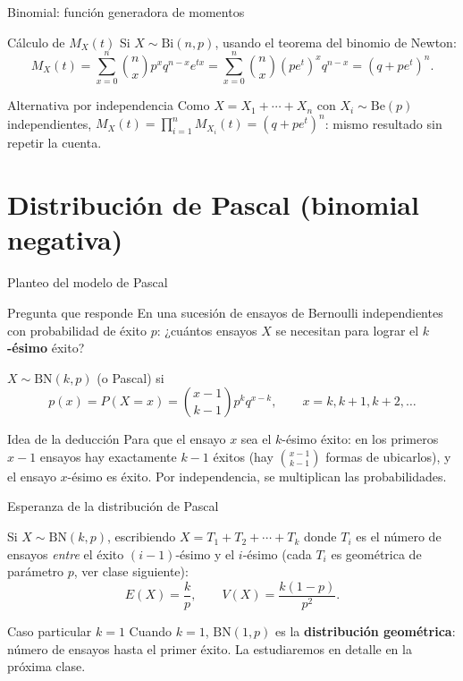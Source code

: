 \documentclass[aspectratio=169,11pt]{beamer}
\begin{document}
\begin{frame}{Binomial: función generadora de momentos}
\begin{block}{Cálculo de $M_X(t)$}
Si $X\sim\text{Bi}(n,p)$, usando el teorema del binomio de Newton:
$$M_X(t) = \sum_{x=0}^n \binom{n}{x}p^xq^{n-x}e^{tx} = \sum_{x=0}^n\binom{n}{x}(pe^t)^xq^{n-x} = (q+pe^t)^n.$$
\end{block}

\begin{alertblock}{Alternativa por independencia}
Como $X=X_1+\cdots+X_n$ con $X_i\sim\text{Be}(p)$ independientes, $M_X(t)=\prod_{i=1}^n M_{X_i}(t) = (q+pe^t)^n$: mismo resultado sin repetir la cuenta.
\end{alertblock}
\end{frame}

\section{Distribución de Pascal (binomial negativa)}

\begin{frame}{Planteo del modelo de Pascal}
\begin{block}{Pregunta que responde}
En una sucesión de ensayos de Bernoulli independientes con probabilidad de éxito $p$: ¿cuántos ensayos $X$ se necesitan para lograr el \textbf{$k$-ésimo} éxito?
\end{block}

\begin{definition}
$X\sim\text{BN}(k,p)$ (o Pascal) si
$$p(x) = P(X=x) = \binom{x-1}{k-1} p^k q^{x-k}, \qquad x=k,k+1,k+2,\dots$$
\end{definition}

\begin{alertblock}{Idea de la deducción}
Para que el ensayo $x$ sea el $k$-ésimo éxito: en los primeros $x-1$ ensayos hay exactamente $k-1$ éxitos (hay $\binom{x-1}{k-1}$ formas de ubicarlos), y el ensayo $x$-ésimo es éxito. Por independencia, se multiplican las probabilidades.
\end{alertblock}
\end{frame}

\begin{frame}{Esperanza de la distribución de Pascal}
\begin{theorem}
Si $X\sim\text{BN}(k,p)$, escribiendo $X = T_1+T_2+\cdots+T_k$ donde $T_i$ es el número de ensayos \emph{entre} el éxito $(i-1)$-ésimo y el $i$-ésimo (cada $T_i$ es geométrica de parámetro $p$, ver clase siguiente):
$$E(X) = \frac{k}{p}, \qquad V(X) = \frac{k(1-p)}{p^2}.$$
\end{theorem}

\begin{alertblock}{Caso particular $k=1$}
Cuando $k=1$, $\text{BN}(1,p)$ es la \textbf{distribución geométrica}: número de ensayos hasta el primer éxito. La estudiaremos en detalle en la próxima clase.
\end{alertblock}
\end{frame}
\end{document}
